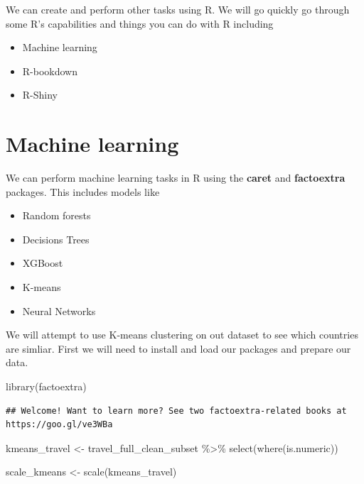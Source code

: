 \documentclass[
]{book}
\newenvironment{Shaded}{\begin{snugshade}}{\end{snugshade}}
\newcommand{\FunctionTok}[1]{\textcolor[rgb]{0.00,0.00,0.00}{#1}}
\newcommand{\NormalTok}[1]{#1}
\newcommand{\OtherTok}[1]{\textcolor[rgb]{0.56,0.35,0.01}{#1}}
\newcommand{\SpecialCharTok}[1]{\textcolor[rgb]{0.00,0.00,0.00}{#1}}
\begin{document}
We can create and perform other tasks using R. We will go quickly go through some R's capabilities and things you can do with R including

\begin{itemize}
\item
  Machine learning
\item
  R-bookdown
\item
  R-Shiny
\end{itemize}

\hypertarget{machine-learning}{%
\section{Machine learning}\label{machine-learning}}

We can perform machine learning tasks in R using the \textbf{caret} and \textbf{factoextra} packages. This includes models like

\begin{itemize}
\item
  Random forests
\item
  Decisions Trees
\item
  XGBoost
\item
  K-means
\item
  Neural Networks
\end{itemize}

We will attempt to use K-means clustering on out dataset to see which countries are simliar. First we will need to install and load our packages and prepare our data.

\begin{Shaded}
\begin{Highlighting}[]
\FunctionTok{library}\NormalTok{(factoextra)}
\end{Highlighting}
\end{Shaded}

\begin{verbatim}
## Welcome! Want to learn more? See two factoextra-related books at https://goo.gl/ve3WBa
\end{verbatim}

\begin{Shaded}
\begin{Highlighting}[]
\NormalTok{kmeans\_travel }\OtherTok{\textless{}{-}}\NormalTok{ travel\_full\_clean\_subset }\SpecialCharTok{\%\textgreater{}\%}
  \FunctionTok{select}\NormalTok{(}\FunctionTok{where}\NormalTok{(is.numeric))}

\NormalTok{scale\_kmeans }\OtherTok{\textless{}{-}} \FunctionTok{scale}\NormalTok{(kmeans\_travel)}
\end{Highlighting}
\end{Shaded}
\end{document}
